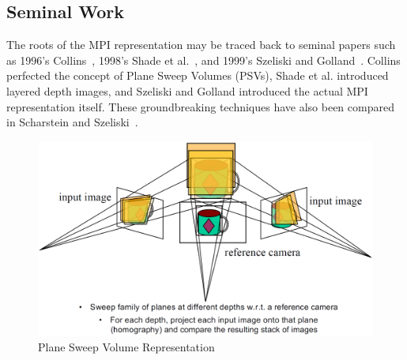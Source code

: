 \subsection{Seminal Work}\label{subsec:seminal-work}

The roots of the MPI representation may be traced back to seminal papers such as 1996's Collins~\cite{collins_space-sweep_1996}, 1998's Shade et al.~\cite{shade_layered_1998}, and 1999's Szeliski and Golland~\cite{szeliski_stereo_1999}. Collins perfected the concept of Plane Sweep Volumes (PSVs), Shade et al. introduced layered depth images, and Szeliski and Golland introduced the actual MPI representation itself. These groundbreaking techniques have also been compared in Scharstein and Szeliski~\cite{scharstein_taxonomy_2002}. 

\begin{figure}[!h]
    \includegraphics[width=1\columnwidth]{figures/plane-sweep-volume.png}
    \caption{Plane Sweep Volume Representation~\cite{svetlana_2019}}
    \label{fig:plane-sweep-volume}
\end{figure}

